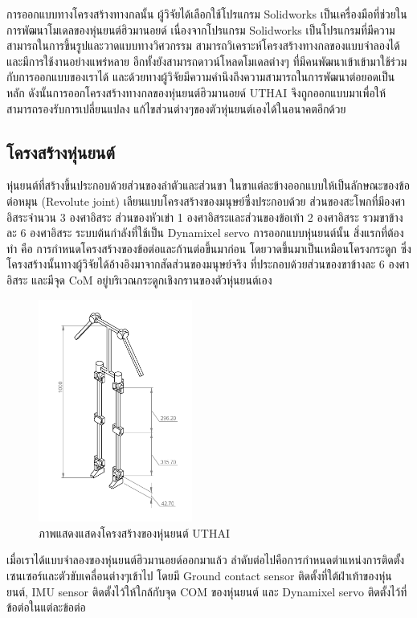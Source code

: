 การออกแบบทางโครงสร้างทางกลนั้น ผู้วิจัยได้เลือกใช้โปรแกรม Solidworks เป็นเครื่องมือที่ช่วยในการพัฒนาโมเดลของหุ่นยนต์ฮิวมานอยด์
เนื่องจากโปรแกรม Solidworks เป็นโปรแกรมที่มีความสามารถในการขึ้นรูปและวาดแบบทางวิศวกรรม
สามารถวิเคราะห์โครงสร้างทางกลของแบบจำลองได้ และมีการใช้งานอย่างแพร่หลาย อีกทั้งยังสามารถดาวน์โหลดโมเดลต่างๆ
ที่มีคนพัฒนาเข้าเข้ามาใช้ร่วมกับการออกแบบของเราได้ และด้วยทางผู้วิจัยมีความคำนึงถึงความสามารถในการพัฒนาต่อยอดเป็นหลัก
ดังนั้นการออกโครงสร้างทางกลของหุ่นยนต์ฮิวมานอยด์ UTHAI จึงถูกออกแบบมาเพื่อให้สามารถรองรับการเปลี่ยนแปลง
แก้ไขส่วนต่างๆของตัวหุ่นยนต์เองได้ในอนาคตอีกด้วย

\subsection{โครงสร้างหุ่นยนต์}
หุ่นยนต์ที่สร้างขึ้นประกอบด้วยส่วนของลำตัวและส่วนขา ในขาแต่ละข้างออกแบบให้เป็นลักษณะของข้อต่อหมุน (Revolute joint)
เลียนแบบโครงสร้างของมนุษย์ซึ่งประกอบด้วย ส่วนของสะโพกที่มีองศาอิสระจำนวน 3 องศาอิสระ ส่วนของหัวเข่า 1
องศาอิสระและส่วนของข้อเท้า 2 องศาอิสระ รวมขาข้างละ 6 องศาอิสระ ระบบต้นกำลังที่ใช้เป็น Dynamixel servo การออกแบบหุ่นยนต์นั้น
สิ่งแรกที่ต้องทำ คือ การกำหนดโครงสร้างของข้อต่อและก้านต่อขึ้นมาก่อน โดยวาดขึ้นมาเป็นเหมือนโครงกระดูก
ซึ่งโครงสร้างนั้นทางผู้วิจัยได้อ้างอิงมาจากสัดส่วนของมนุษย์จริง ที่ประกอบด้วยส่วนของขาข้างละ 6 องศาอิสระ และมีจุด CoM
อยู่บริเวณกระดูกเชิงกรานของตัวหุ่นยนต์เอง
\begin{figure}[ht]
    \centering
    \includegraphics[width=0.45\textwidth]{chapter3/images/uthai_structure1.png}
    \caption{ภาพแสดงแสดงโครงสร้างของหุ่นยนต์ UTHAI}
    \label{fig:uthai_structure1}
\end{figure}

เมื่อเราได้แบบจำลองของหุ่นยนต์ฮิวมานอยด์ออกมาแล้ว ลำดับต่อไปคือการกำหนดตำแหน่งการติดตั้งเซนเซอร์และตัวขับเคลื่อนต่างๆเข้าไป
โดยมี Ground contact sensor ติดตั้งที่ใต้ฝ่าเท้าของหุ่นยนต์, IMU sensor ติดตั้งไว้ให้ใกล้กับจุด COM ของหุ่นยนต์ และ Dynamixel servo
ติดตั้งไว้ที่ข้อต่อในแต่ละข้อต่อ
\clearpage

